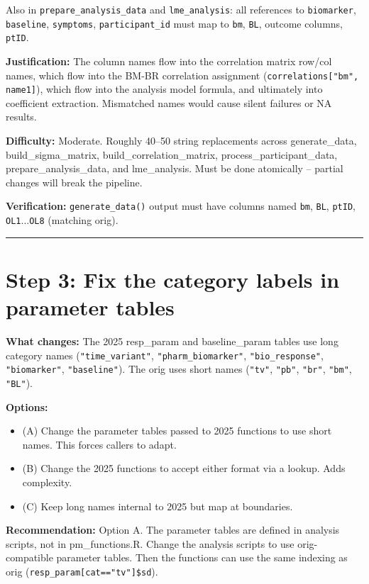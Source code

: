 \documentclass[11pt]{article}
\begin{document}
Also in \texttt{prepare\_analysis\_data} and \texttt{lme\_analysis}: all references
to \texttt{biomarker}, \texttt{baseline}, \texttt{symptoms}, \texttt{participant\_id} must map
to \texttt{bm}, \texttt{BL}, outcome columns, \texttt{ptID}.

\textbf{Justification:} The column names flow into the correlation matrix
row/col names, which flow into the BM-BR correlation assignment
(\texttt{correlations["bm", name1]}), which flow into the analysis model
formula, and ultimately into coefficient extraction. Mismatched
names would cause silent failures or NA results.

\textbf{Difficulty:} Moderate. Roughly 40--50 string replacements across
generate\_data, build\_sigma\_matrix, build\_correlation\_matrix,
process\_participant\_data, prepare\_analysis\_data, and lme\_analysis.
Must be done atomically -- partial changes will break the pipeline.

\textbf{Verification:} \texttt{generate\_data()} output must have columns named
\texttt{bm}, \texttt{BL}, \texttt{ptID}, \texttt{OL1}...\texttt{OL8} (matching orig).

\bigskip\noindent\rule{\textwidth}{0.4pt}\bigskip

\section{Step 3: Fix the category labels in parameter tables}

\textbf{What changes:} The 2025 resp\_param and baseline\_param tables use
long category names (\texttt{"time\_variant"}, \texttt{"pharm\_biomarker"},
\texttt{"bio\_response"}, \texttt{"biomarker"}, \texttt{"baseline"}). The orig uses short
names (\texttt{"tv"}, \texttt{"pb"}, \texttt{"br"}, \texttt{"bm"}, \texttt{"BL"}).

\textbf{Options:}

\begin{itemize}
  \item (A) Change the parameter tables passed to 2025 functions to use
    short names. This forces callers to adapt.
  \item (B) Change the 2025 functions to accept either format via a
    lookup. Adds complexity.
  \item (C) Keep long names internal to 2025 but map at boundaries.
\end{itemize}

\textbf{Recommendation:} Option A. The parameter tables are defined in
analysis scripts, not in pm\_functions.R. Change the analysis scripts
to use orig-compatible parameter tables. Then the functions can use
the same indexing as orig (\texttt{resp\_param[cat=="tv"]\$sd}).
\end{document}
